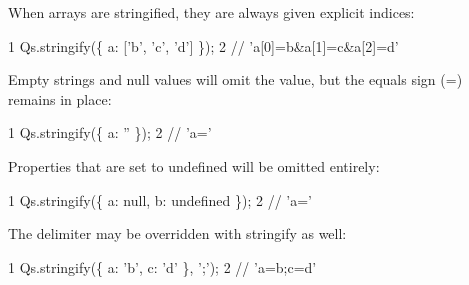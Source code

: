 When arrays are stringified, they are always given explicit indices\+:


\begin{DoxyCode}
1 Qs.stringify(\{ a: ['b', 'c', 'd'] \});
2 // 'a[0]=b&a[1]=c&a[2]=d'
\end{DoxyCode}


Empty strings and null values will omit the value, but the equals sign (=) remains in place\+:


\begin{DoxyCode}
1 Qs.stringify(\{ a: '' \});
2 // 'a='
\end{DoxyCode}


Properties that are set to {\ttfamily undefined} will be omitted entirely\+:


\begin{DoxyCode}
1 Qs.stringify(\{ a: null, b: undefined \});
2 // 'a='
\end{DoxyCode}


The delimiter may be overridden with stringify as well\+:


\begin{DoxyCode}
1 Qs.stringify(\{ a: 'b', c: 'd' \}, ';');
2 // 'a=b;c=d'
\end{DoxyCode}
 